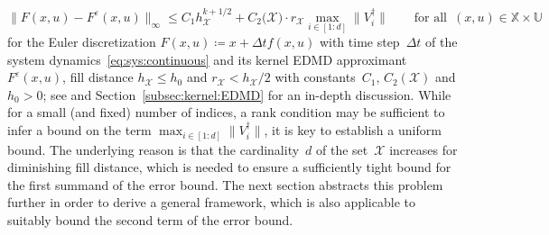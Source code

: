 \documentclass[a4paper, reqno]{amsart}
\begin{document}
\begin{equation}\nonumber
        \| F(x,u) - F^\varepsilon(x,u)\|_\infty \leq C_1 h_\mathcal{X}^{k+1/2} + C_2(\mathcal{X)} \cdot 
        r_\mathcal{X}
        \max_{i \in [1:d]}\|V_i^\dagger\| \qquad \text{for all }\,(x,u) \in \mathbb{X} \times \mathbb{U}
\end{equation}
for the Euler discretization $F(x, u) \coloneqq x + \Delta t f(x, u)$ with time step~$\Delta t$ of the system dynamics~\eqref{eq:sys:continuous} and its kernel EDMD approximant $F^\varepsilon(x, u)$, 
fill distance $h_\mathcal{X} \leq h_0$ and $r_{\mathcal{X}} < h_{\mathcal{X}}/2$ with constants~$C_1$, $C_2(\mathcal{X})$ and $h_0 > 0$; see \cite[Thm.\ 3, Prop.\ 2]{schimperna2025data} and Section~\ref{subsec:kernel:EDMD} for an in-depth discussion.
While for a small (and fixed) number of indices, a rank condition may be sufficient to infer a 
bound on the term $\max_{i \in [1:d]}\|V_i^\dagger\|$, it is key to establish a uniform bound. 
The underlying reason is that the cardinality~$d$ of the set~$\mathcal{X}$ increases for diminishing 
fill distance, which is needed to ensure a sufficiently tight bound for the first summand of the error bound.  
The next section abstracts this problem further in order to derive a general framework, which is also applicable to suitably bound the second term of the error bound. 

    
\end{document}
